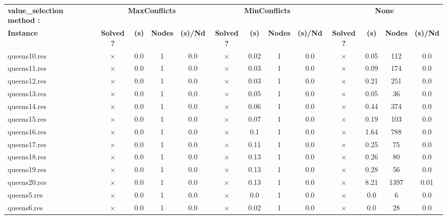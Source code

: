 \documentclass[main.tex]{subfiles}
\begin{document}
\thispagestyle{empty}

\begin{landscape}
\begin{center}
\renewcommand{\arraystretch}{1.4} 
\begin{tabular}{lcccccccccccc}
	\hline
\textbf{value_selection method :} & \multicolumn{4}{c}{\textbf{MaxConflicts}} & \multicolumn{4}{c}{\textbf{MinConflicts}} & \multicolumn{4}{c}{\textbf{None}}\\
\textbf{Instance}  & \textbf{Solved ?} & \textbf{(s)} & \textbf{Nodes} & \textbf{(s)/Nd} & \textbf{Solved ?} & \textbf{(s)} & \textbf{Nodes} & \textbf{(s)/Nd} & \textbf{Solved ?} & \textbf{(s)} & \textbf{Nodes} & \textbf{(s)/Nd}\\\hline

queens10.res & $\times$ & 0.0 & 1 & 0.0
 & $\times$ & 0.02 & 1 & 0.0
 & $\times$ & 0.05 & 112 & 0.0
\\
queens11.res & $\times$ & 0.0 & 1 & 0.0
 & $\times$ & 0.03 & 1 & 0.0
 & $\times$ & 0.09 & 174 & 0.0
\\
queens12.res & $\times$ & 0.0 & 1 & 0.0
 & $\times$ & 0.03 & 1 & 0.0
 & $\times$ & 0.21 & 251 & 0.0
\\
queens13.res & $\times$ & 0.0 & 1 & 0.0
 & $\times$ & 0.05 & 1 & 0.0
 & $\times$ & 0.05 & 36 & 0.0
\\
queens14.res & $\times$ & 0.0 & 1 & 0.0
 & $\times$ & 0.06 & 1 & 0.0
 & $\times$ & 0.44 & 374 & 0.0
\\
queens15.res & $\times$ & 0.0 & 1 & 0.0
 & $\times$ & 0.07 & 1 & 0.0
 & $\times$ & 0.19 & 103 & 0.0
\\
queens16.res & $\times$ & 0.0 & 1 & 0.0
 & $\times$ & 0.1 & 1 & 0.0
 & $\times$ & 1.64 & 788 & 0.0
\\
queens17.res & $\times$ & 0.0 & 1 & 0.0
 & $\times$ & 0.11 & 1 & 0.0
 & $\times$ & 0.25 & 75 & 0.0
\\
queens18.res & $\times$ & 0.0 & 1 & 0.0
 & $\times$ & 0.13 & 1 & 0.0
 & $\times$ & 0.26 & 80 & 0.0
\\
queens19.res & $\times$ & 0.0 & 1 & 0.0
 & $\times$ & 0.13 & 1 & 0.0
 & $\times$ & 0.28 & 56 & 0.0
\\
queens20.res & $\times$ & 0.0 & 1 & 0.0
 & $\times$ & 0.13 & 1 & 0.0
 & $\times$ & 8.21 & 1397 & 0.01
\\
queens5.res & $\times$ & 0.0 & 1 & 0.0
 & $\times$ & 0.0 & 1 & 0.0
 & $\times$ & 0.0 & 6 & 0.0
\\
queens6.res & $\times$ & 0.0 & 1 & 0.0
 & $\times$ & 0.02 & 1 & 0.0
 & $\times$ & 0.0 & 28 & 0.0

\end{tabular}
\end{center}
\end{landscape}
\end{document}
